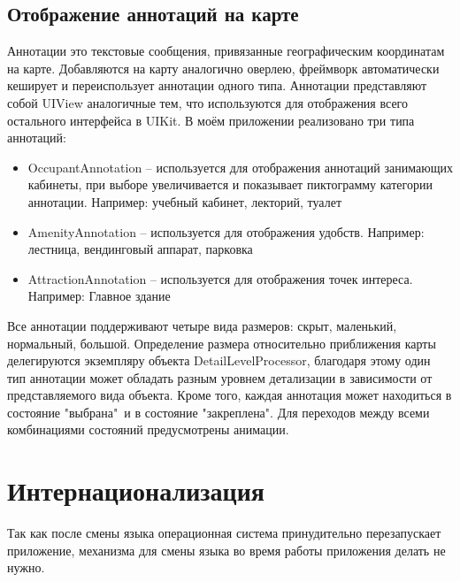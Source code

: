     \subsection{Отображение аннотаций на карте}
      Аннотации это текстовые сообщения, привязанные географическим координатам на карте. Добавляются на карту аналогично оверлею, фреймворк автоматически кеширует и переиспользует аннотации одного типа. Аннотации представляют собой UIView аналогичные тем, что используются для отображения всего остального интерфейса в UIKit.
      В моём приложении реализовано три типа аннотаций:
      \begin{itemize}
        \item OccupantAnnotation -- используется для отображения аннотаций занимающих кабинеты, при выборе увеличивается и показывает пиктограмму категории аннотации. Например: учебный кабинет, лекторий, туалет
        \item AmenityAnnotation -- используется для отображения удобств. Например: лестница, вендинговый аппарат, парковка
        \item AttractionAnnotation -- используется для отображения точек интереса. Например: Главное здание
      \end{itemize}


      Все аннотации поддерживают четыре вида размеров: скрыт, маленький, нормальный, большой. Определение размера относительно приближения карты делегируются экземпляру объекта DetailLevelProcessor, благодаря этому один тип аннотации может обладать разным уровнем детализации в зависимости от представляемого вида объекта. Кроме того, каждая аннотация может находиться в состояние "выбрана"\ и в состояние "закреплена". Для переходов между всеми комбинациями состояний предусмотрены анимации.


  \section{Интернационализация}
    Так как после смены языка операционная система принудительно перезапускает приложение, механизма для смены языка во время работы приложения делать не нужно.

